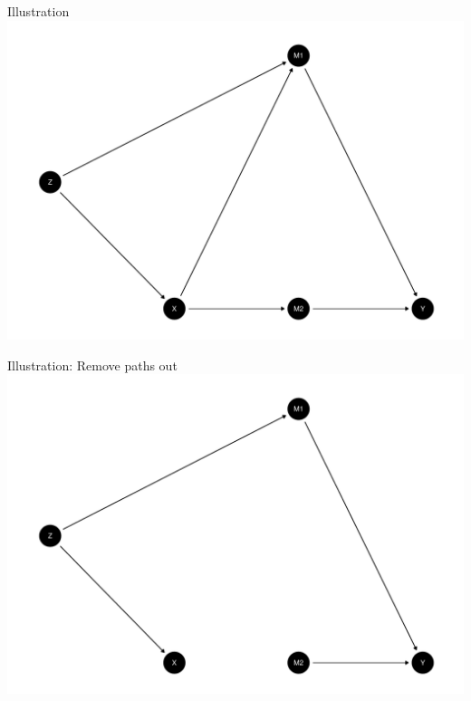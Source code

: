\documentclass[
  11pt,
  ignorenonframetext,
]{beamer}
\begin{document}
\begin{frame}{Illustration}
\protect\hypertarget{illustration}{}
\includegraphics{0_lectures_files/figure-beamer/unnamed-chunk-236-1.pdf}
\end{frame}

\begin{frame}{Illustration: Remove paths out}
\protect\hypertarget{illustration-remove-paths-out}{}
\includegraphics{0_lectures_files/figure-beamer/unnamed-chunk-237-1.pdf}
\end{frame}
\end{document}
